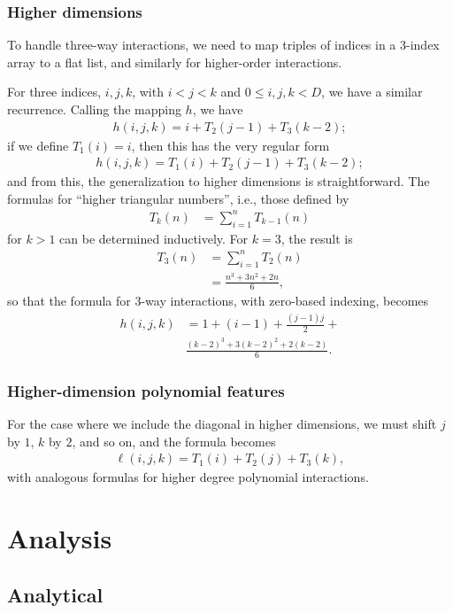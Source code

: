 \documentclass{article} %
\begin{document}
\subsubsection{Higher dimensions}
To handle three-way interactions, we need to map triples of indices in a 3-index array to a flat list, and similarly for higher-order interactions. 

For three indices, $i,j,k$, with $i < j < k$ and $0 \le i,j,k < D$, we have a similar recurrence. Calling the mapping $h$, we have 
\begin{align}
h(i,j,k) = i + T_2(j-1) + T_3(k-2);
\end{align}
if we define $T_1(i) = i$, then this has the very regular form
\begin{align}
h(i,j,k) =  T_1(i) + T_2(j-1) + T_3(k-2);
\end{align}
and from this, the generalization to higher dimensions is straightforward. The formulas for ``higher triangular numbers'', i.e., those defined by
\begin{align}
T_k(n) &= \sum_{i=1}^n T_{k-1}(n)
\end{align}
for $k > 1$ can be determined inductively. For $k = 3$, the result is 
\begin{align}
T_3(n) &= \sum_{i=1}^n T_{2}(n)\\
&= \frac{n^3 + 3n^2 + 2n}{6},
\end{align}
so that the formula for 3-way interactions, with zero-based indexing, becomes 
\begin{align}
h(i, j, k) &= 1 + (i-1) + \frac{(j-1)j}{2} + \\
& \frac{(k-2)^3 + 3(k-2)^2 + 2(k-2)}{6}. 
\end{align}
\subsubsection{Higher-dimension polynomial features}
For the case where we include the diagonal in higher dimensions, we must shift $j$ by $1$, $k$ by $2$, and so on, and the formula becomes
\begin{align}
\ell(i,j,k) =  T_1(i) + T_2(j) + T_3(k),
\end{align}
with analogous formulas for higher degree polynomial interactions. 

\section{Analysis}
\subsection{Analytical}
\end{document}
